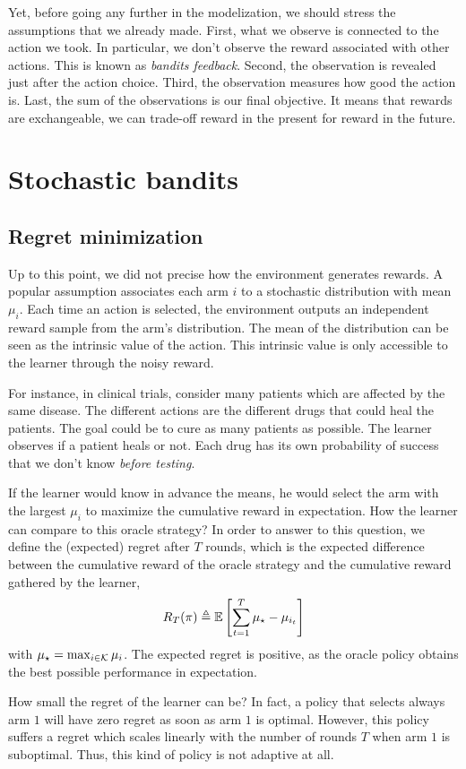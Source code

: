{Yet, before going any further in the modelization, we should stress the assumptions that we already made. First, what we observe is connected to the action we took. In particular, we don't observe the reward associated with other actions. This is known as \emph{bandits feedback}. Second, the observation is revealed just after the action choice. Third, the observation measures how good the action is. Last, the sum of the observations is our final objective. It means that rewards are exchangeable, we can trade-off reward in the present for reward in the future.

\section{Stochastic bandits}
\label{sec:stoch-bandits}
\subsection{Regret minimization}
Up to this point, we did not precise how the environment generates rewards. A popular assumption associates each arm $i$ to a stochastic distribution with mean $\mu_i$. Each time an action is selected, the environment outputs an independent reward sample from the arm's distribution. The mean of the distribution can be seen as the intrinsic value of the action. This intrinsic value is only accessible to the learner through the noisy reward.

For instance, in clinical trials, consider many patients which are affected by the same disease. The different actions are the different drugs that could heal the patients. The goal could be to cure as many patients as possible. The learner observes if a patient heals or not.  Each drug has its own probability of success that we don't know \emph{before testing}. 

If the learner would know in advance the means, he would select the arm with the largest $\mu_i$ to maximize the cumulative reward in expectation. How the learner can compare to this oracle strategy? In order to answer to this question, we define the (expected) regret after $T$ rounds, which is the expected difference between the cumulative reward of the oracle strategy and the cumulative reward gathered by the learner,
\[
R_T(\pi) \triangleq \mathbb{E}\left[\sum_{t=1}^T \mu_\star - \mu_{i_t}\right]
\]
with $\mu_\star = \max_{i\in \mathcal{K}} \mu_i$. The expected regret is positive, as the oracle policy obtains the best possible performance in expectation. 

How small the regret of the learner can be? In fact, a policy that selects always arm $1$ will have zero regret as soon as arm $1$ is optimal. However, this policy suffers a regret which scales linearly with the number of rounds $T$ when arm $1$ is suboptimal. Thus, this kind of policy is not adaptive at all.  

}
